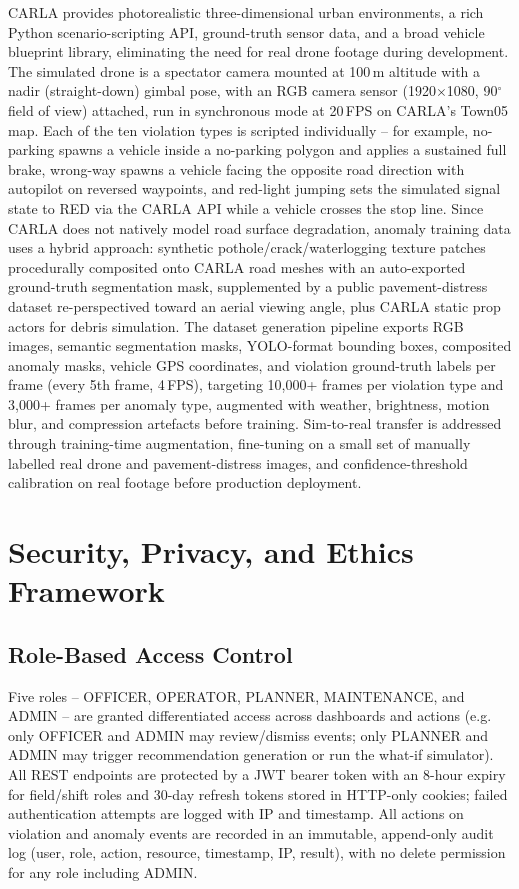 \documentclass[conference]{IEEEtran}
\begin{document}
CARLA provides photorealistic three-dimensional urban environments, a rich Python scenario-scripting API, ground-truth sensor data, and a broad vehicle blueprint library, eliminating the need for real drone footage during development. The simulated drone is a spectator camera mounted at 100\,m altitude with a nadir (straight-down) gimbal pose, with an RGB camera sensor (1920$\times$1080, 90$^\circ$ field of view) attached, run in synchronous mode at 20\,FPS on CARLA's Town05 map. Each of the ten violation types is scripted individually -- for example, no-parking spawns a vehicle inside a no-parking polygon and applies a sustained full brake, wrong-way spawns a vehicle facing the opposite road direction with autopilot on reversed waypoints, and red-light jumping sets the simulated signal state to RED via the CARLA API while a vehicle crosses the stop line. Since CARLA does not natively model road surface degradation, anomaly training data uses a hybrid approach: synthetic pothole/crack/waterlogging texture patches procedurally composited onto CARLA road meshes with an auto-exported ground-truth segmentation mask, supplemented by a public pavement-distress dataset re-perspectived toward an aerial viewing angle, plus CARLA static prop actors for debris simulation. The dataset generation pipeline exports RGB images, semantic segmentation masks, YOLO-format bounding boxes, composited anomaly masks, vehicle GPS coordinates, and violation ground-truth labels per frame (every 5th frame, 4\,FPS), targeting 10,000+ frames per violation type and 3,000+ frames per anomaly type, augmented with weather, brightness, motion blur, and compression artefacts before training. Sim-to-real transfer is addressed through training-time augmentation, fine-tuning on a small set of manually labelled real drone and pavement-distress images, and confidence-threshold calibration on real footage before production deployment.

\section{Security, Privacy, and Ethics Framework}
\label{sec:security}

\subsection{Role-Based Access Control}

Five roles -- OFFICER, OPERATOR, PLANNER, MAINTENANCE, and ADMIN -- are granted differentiated access across dashboards and actions (e.g. only OFFICER and ADMIN may review/dismiss events; only PLANNER and ADMIN may trigger recommendation generation or run the what-if simulator). All REST endpoints are protected by a JWT bearer token with an 8-hour expiry for field/shift roles and 30-day refresh tokens stored in HTTP-only cookies; failed authentication attempts are logged with IP and timestamp. All actions on violation and anomaly events are recorded in an immutable, append-only audit log (user, role, action, resource, timestamp, IP, result), with no delete permission for any role including ADMIN.
\end{document}
